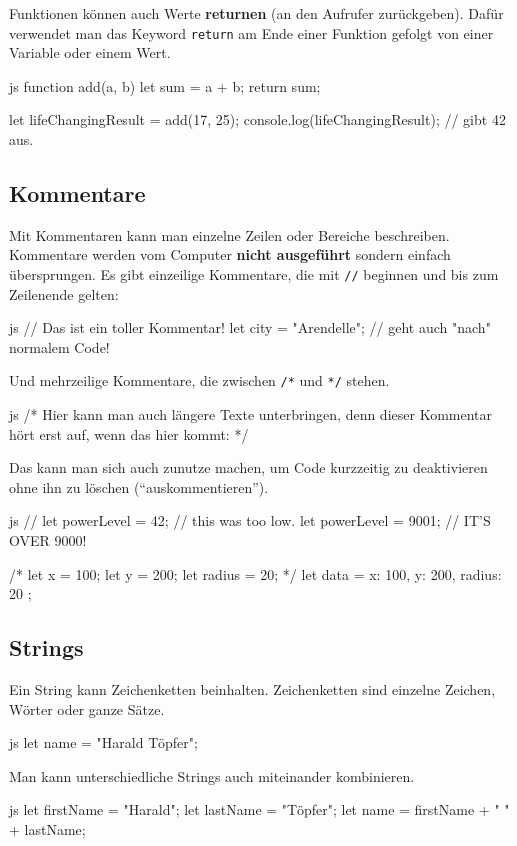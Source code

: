 \documentclass[10pt,a4paper]{article}
\begin{document}
\begin{multicols}{3}
Funktionen können auch Werte \textbf{returnen} (an den Aufrufer zurückgeben). Dafür verwendet man das Keyword \texttt{return} am Ende einer Funktion gefolgt von einer Variable oder einem Wert.
\begin{codebox}{js}{}
  function add(a, b) {
    let sum = a + b;
    return sum;
  }
  
  let lifeChangingResult = add(17, 25);
  console.log(lifeChangingResult); // gibt 42 aus.
\end{codebox}


\subsection*{Kommentare}
Mit Kommentaren kann man einzelne Zeilen oder Bereiche beschreiben. Kommentare werden vom Computer \textbf{nicht ausgeführt} sondern einfach übersprungen. Es gibt einzeilige Kommentare, die mit \texttt{//} beginnen und bis zum Zeilenende gelten:
\begin{codebox}{js}{}
  // Das ist ein toller Kommentar!
  let city = "Arendelle"; // geht auch "nach" normalem Code!
\end{codebox}

Und mehrzeilige Kommentare, die zwischen \texttt{/*} und \texttt{*/} stehen.
\begin{codebox}{js}{}
  /* Hier kann man auch längere Texte unterbringen,
  denn dieser Kommentar hört erst auf, wenn
  das hier kommt: */
\end{codebox}

Das kann man sich auch zunutze machen, um Code kurzzeitig zu deaktivieren ohne ihn zu löschen (\enquote{auskommentieren}).
\begin{codebox}{js}{}
  // let powerLevel = 42; // this was too low.
  let powerLevel = 9001; // IT'S OVER 9000!

  /*
  let x = 100;
  let y = 200;
  let radius = 20;
  */
  let data = {
    x: 100,
    y: 200,
    radius: 20
  };
\end{codebox}

\subsection*{Strings}
Ein String kann Zeichenketten beinhalten. Zeichenketten sind einzelne Zeichen, Wörter oder ganze Sätze.
\begin{codebox}{js}{}
  let name = "Harald Töpfer";
\end{codebox}
Man kann unterschiedliche Strings auch miteinander kombinieren.
\begin{codebox}{js}{}
  let firstName = "Harald";
  let lastName = "Töpfer";
  let name = firstName + " " + lastName;
\end{codebox}


\end{multicols}
\end{document}
